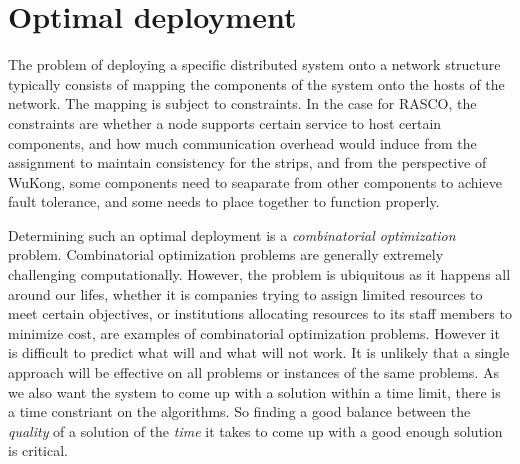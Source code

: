 

\section{Optimal deployment}

The problem of deploying a specific distributed system onto a network structure
typically consists of mapping the components of the system onto the hosts of
the network. The mapping is subject to constraints. In the case for RASCO, the
constraints are whether a node supports certain service to host certain
components, and how much communication overhead would induce from the
assignment to maintain consistency for the strips, and from the perspective of
WuKong, some components need to seaparate from other components to achieve
fault tolerance, and some needs to place together to function properly.

Determining such an optimal deployment is a \emph{combinatorial optimization}
problem. Combinatorial optimization problems are generally extremely
challenging computationally. However, the problem is ubiquitous as it happens
all around our lifes, whether it is companies trying to assign limited
resources to meet certain objectives, or institutions allocating resources to
its staff members to minimize cost, are examples of combinatorial optimization
problems. However it is difficult to predict what will and what will not work.
It is unlikely that a single approach will be effective on all problems or 
instances of the same problems. As we also want the system to come up with a solution within a time limit, there is a time constriant on the algorithms. So finding a good balance between the \emph{quality} of a solution of the \emph{time} it takes to come up with a good enough solution is critical.




